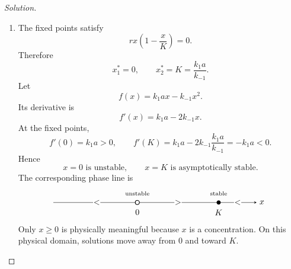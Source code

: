 \documentclass[10pt]{amsart}
\newenvironment{solution}
{\begin{proof}[Solution]}
{\end{proof}}
\begin{document}
\begin{onehalfspace}
\begin{solution}
            \begin{enumerate}[label=\alph*)]
                \item The fixed points satisfy
                \[
                    rx\left(1-\frac{x}{K}\right)=0.
                \]
                Therefore
                \[
                    \boxed{x_1^*=0,
                        \qquad
                        x_2^*=K=\frac{k_1a}{k_{-1}}.}
                \]
                Let
                \[
                    f(x)=k_1ax-k_{-1}x^2.
                \]
                Its derivative is
                \[
                    f'(x)=k_1a-2k_{-1}x.
                \]
                At the fixed points,
                \[
                    f'(0)=k_1a>0,
                    \qquad
                    f'(K)=k_1a-2k_{-1}\frac{k_1a}{k_{-1}}
                    =-k_1a<0.
                \]
                Hence
                \[
                    \boxed{x=0\text{ is unstable},
                        \qquad
                        x=K\text{ is asymptotically stable}.}
                \]
                The corresponding phase line is
                \[
                    \begin{tikzpicture}[baseline=-0.5ex,>=stealth,x=1.15cm]
                  \draw[->] (-3.1,0)--(4.4,0) node[right] {$x$};
                  \draw[fill=white,thick] (0,0) circle (2.5pt);
                  \fill (3,0) circle (2.5pt);
                  \node[below=5pt] at (0,0) {$0$};
                  \node[below=5pt] at (3,0) {$K$};
                  \node[above=5pt] at (0,0) {\scriptsize unstable};
                  \node[above=5pt] at (3,0) {\scriptsize stable};
                  \node[fill=white,inner sep=0.5pt] at (-1.5,0) {$<$};
                  \node[fill=white,inner sep=0.5pt] at ( 1.5,0) {$>$};
                  \node[fill=white,inner sep=0.5pt] at ( 3.7,0) {$<$};
                    \end{tikzpicture}
                \]
                Only $x\geq0$ is physically meaningful because $x$ is a concentration.
                On this physical domain, solutions move away from $0$ and toward $K$.


\end{enumerate}
\end{solution}
\end{onehalfspace}
\end{document}
